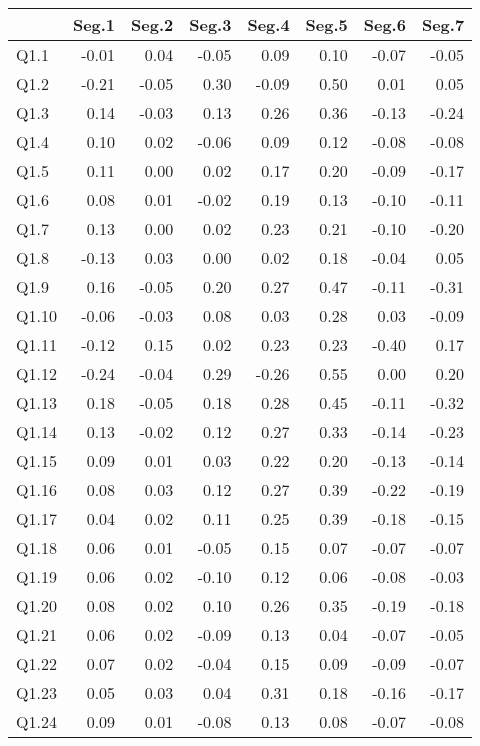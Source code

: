 \documentclass[
]{article}
\begin{document}
\begin{center}
\begin{longtable}{lrrrrrrr}
\toprule
  & Seg.1 & Seg.2 & Seg.3 & Seg.4 & Seg.5 & Seg.6 & Seg.7\\
\midrule
Q1.1 & -0.01 & 0.04 & -0.05 & 0.09 & 0.10 & -0.07 & -0.05\\
Q1.2 & -0.21 & -0.05 & 0.30 & -0.09 & 0.50 & 0.01 & 0.05\\
Q1.3 & 0.14 & -0.03 & 0.13 & 0.26 & 0.36 & -0.13 & -0.24\\
Q1.4 & 0.10 & 0.02 & -0.06 & 0.09 & 0.12 & -0.08 & -0.08\\
Q1.5 & 0.11 & 0.00 & 0.02 & 0.17 & 0.20 & -0.09 & -0.17\\
\addlinespace
Q1.6 & 0.08 & 0.01 & -0.02 & 0.19 & 0.13 & -0.10 & -0.11\\
Q1.7 & 0.13 & 0.00 & 0.02 & 0.23 & 0.21 & -0.10 & -0.20\\
Q1.8 & -0.13 & 0.03 & 0.00 & 0.02 & 0.18 & -0.04 & 0.05\\
Q1.9 & 0.16 & -0.05 & 0.20 & 0.27 & 0.47 & -0.11 & -0.31\\
Q1.10 & -0.06 & -0.03 & 0.08 & 0.03 & 0.28 & 0.03 & -0.09\\
\addlinespace
Q1.11 & -0.12 & 0.15 & 0.02 & 0.23 & 0.23 & -0.40 & 0.17\\
Q1.12 & -0.24 & -0.04 & 0.29 & -0.26 & 0.55 & 0.00 & 0.20\\
Q1.13 & 0.18 & -0.05 & 0.18 & 0.28 & 0.45 & -0.11 & -0.32\\
Q1.14 & 0.13 & -0.02 & 0.12 & 0.27 & 0.33 & -0.14 & -0.23\\
Q1.15 & 0.09 & 0.01 & 0.03 & 0.22 & 0.20 & -0.13 & -0.14\\
\addlinespace
Q1.16 & 0.08 & 0.03 & 0.12 & 0.27 & 0.39 & -0.22 & -0.19\\
Q1.17 & 0.04 & 0.02 & 0.11 & 0.25 & 0.39 & -0.18 & -0.15\\
Q1.18 & 0.06 & 0.01 & -0.05 & 0.15 & 0.07 & -0.07 & -0.07\\
Q1.19 & 0.06 & 0.02 & -0.10 & 0.12 & 0.06 & -0.08 & -0.03\\
Q1.20 & 0.08 & 0.02 & 0.10 & 0.26 & 0.35 & -0.19 & -0.18\\
\addlinespace
Q1.21 & 0.06 & 0.02 & -0.09 & 0.13 & 0.04 & -0.07 & -0.05\\
Q1.22 & 0.07 & 0.02 & -0.04 & 0.15 & 0.09 & -0.09 & -0.07\\
Q1.23 & 0.05 & 0.03 & 0.04 & 0.31 & 0.18 & -0.16 & -0.17\\
Q1.24 & 0.09 & 0.01 & -0.08 & 0.13 & 0.08 & -0.07 & -0.08\\

\end{longtable}
\end{center}
\end{document}
